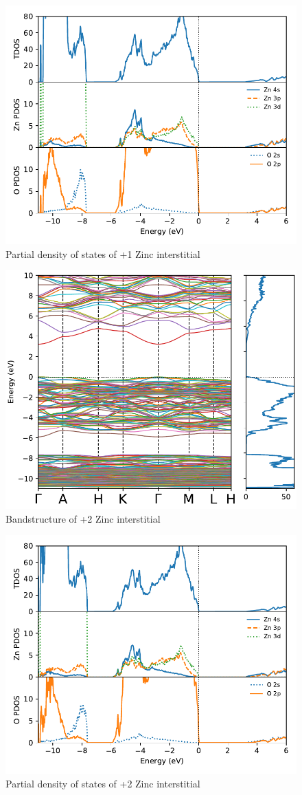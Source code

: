 \begin{figure}[tbh!]
	\centering
	\includegraphics[width=0.6\linewidth]{"images/rnd/dos-pdos_Zn_i-p1"}
	\caption[Partial density of states of +1 Zinc interstitial]{Partial density of states of +1 Zinc interstitial }
\end{figure}


\begin{figure}[tbh!]
	\centering
	\includegraphics[width=0.6\linewidth]{"images/rnd/band-dos_Zn_i-p2"}
	\caption[Bandstructure of +2 Zinc interstitial]{Bandstructure of +2 Zinc interstitial}
\end{figure}

\begin{figure}[tbh!]
	\centering
	\includegraphics[width=0.6\linewidth]{"images/rnd/dos-pdos_Zn_i-p2"}
	\caption[Partial density of states of +2 Zinc interstitial]{Partial density of states of +2 Zinc interstitial }
\end{figure}


